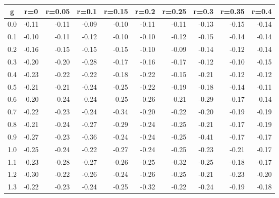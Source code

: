 %
\begin{table}[!tbp]
 \begin{center}
 \begin{tabular}{rrrrrrrrrr}\hline\hline
\multicolumn{1}{c}{g}&\multicolumn{1}{c}{r=0}&\multicolumn{1}{c}{r=0.05}&\multicolumn{1}{c}{r=0.1}&\multicolumn{1}{c}{r=0.15}&\multicolumn{1}{c}{r=0.2}&\multicolumn{1}{c}{r=0.25}&\multicolumn{1}{c}{r=0.3}&\multicolumn{1}{c}{r=0.35}&\multicolumn{1}{c}{r=0.4}\tabularnewline
\hline
0.0&-0.11&-0.11&-0.09&-0.10&-0.11&-0.11&-0.13&-0.15&-0.14\tabularnewline
0.1&-0.10&-0.11&-0.12&-0.10&-0.10&-0.12&-0.15&-0.14&-0.14\tabularnewline
0.2&-0.16&-0.15&-0.15&-0.15&-0.10&-0.09&-0.14&-0.12&-0.14\tabularnewline
0.3&-0.20&-0.20&-0.28&-0.17&-0.16&-0.17&-0.12&-0.10&-0.15\tabularnewline
0.4&-0.23&-0.22&-0.22&-0.18&-0.22&-0.15&-0.21&-0.12&-0.12\tabularnewline
0.5&-0.21&-0.21&-0.24&-0.25&-0.22&-0.19&-0.18&-0.14&-0.11\tabularnewline
0.6&-0.20&-0.24&-0.24&-0.25&-0.26&-0.21&-0.29&-0.17&-0.14\tabularnewline
0.7&-0.22&-0.23&-0.24&-0.34&-0.20&-0.22&-0.20&-0.19&-0.19\tabularnewline
0.8&-0.21&-0.24&-0.27&-0.29&-0.24&-0.25&-0.21&-0.17&-0.19\tabularnewline
0.9&-0.27&-0.23&-0.36&-0.24&-0.24&-0.25&-0.41&-0.17&-0.17\tabularnewline
1.0&-0.25&-0.24&-0.22&-0.27&-0.24&-0.25&-0.23&-0.21&-0.17\tabularnewline
1.1&-0.23&-0.28&-0.27&-0.26&-0.25&-0.32&-0.25&-0.18&-0.17\tabularnewline
1.2&-0.30&-0.22&-0.26&-0.24&-0.26&-0.25&-0.21&-0.23&-0.20\tabularnewline
1.3&-0.22&-0.23&-0.24&-0.25&-0.32&-0.22&-0.24&-0.19&-0.18\tabularnewline
\hline
\end{tabular}

\end{center}

\end{table}


